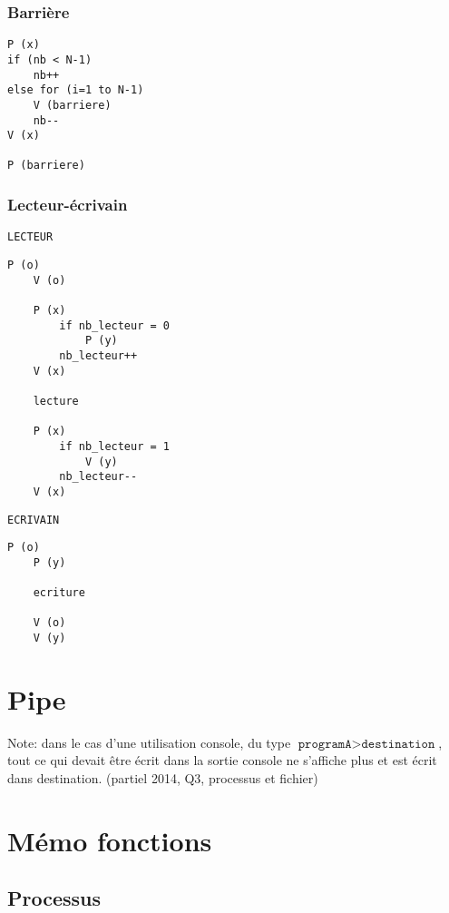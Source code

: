 \documentclass[10pt,twocolumn,a4paper]{article}
\begin{document}
\subsubsection{Barrière}

\begin{lstlisting}[xleftmargin=1cm,frame=shadowbox]
P (x)
if (nb < N-1)
    nb++
else for (i=1 to N-1) 
    V (barriere)
    nb--
V (x)

P (barriere)
\end{lstlisting}

\subsubsection{Lecteur-\'ecrivain}

\texttt{LECTEUR}
\begin{lstlisting}[frame=shadowbox,xrightmargin=1cm]
    P (o)
    V (o)

    P (x)
        if nb_lecteur = 0
            P (y)
        nb_lecteur++
    V (x)

    lecture

    P (x)
        if nb_lecteur = 1
            V (y)
        nb_lecteur--
    V (x)
\end{lstlisting}

\texttt{ECRIVAIN}
\begin{lstlisting}[frame=shadowbox,xrightmargin=1cm]
    P (o)
    P (y)

    ecriture

    V (o)
    V (y)
\end{lstlisting}

\section{Pipe}

Note: dans le cas d'une utilisation console, du type $\texttt{programA} > \texttt{destination}$, tout ce qui devait être écrit dans la sortie console ne s'affiche plus et est écrit dans destination. (partiel 2014, Q3, processus et fichier)


\section{Mémo fonctions}

\subsection{Processus}
\end{document}
